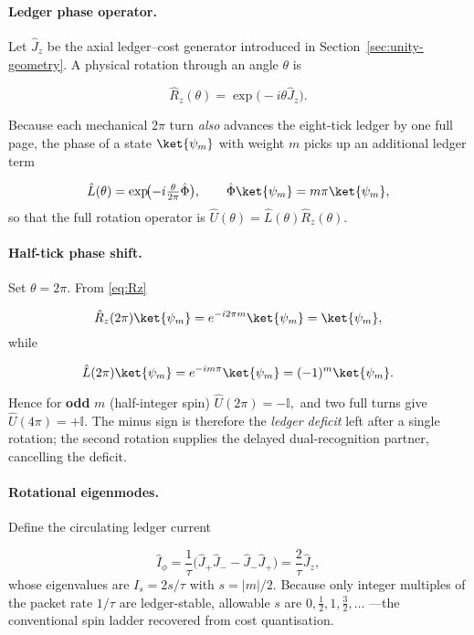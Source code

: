 \documentclass[11pt,oneside]{book}
\begin{document}
\paragraph{Ledger phase operator.}
Let $\hat J_{z}$ be the axial ledger–cost generator introduced in
Section~\ref{sec:unity-geometry}.  
A physical rotation through an angle $\theta$ is

\[
   \hat R_{z}(\theta)=\exp\!\bigl(-i\theta\hat J_{z}\bigr).
   \label{eq:Rz}
\]

Because each mechanical $2\pi$ turn \emph{also} advances the eight-tick
ledger by one full page, the phase of a state $\ket{\psi_{m}}$ with
weight $m$ picks up an additional ledger term

\[
   \hat L(\theta)
   =\exp\!\bigl(-i\tfrac{\theta}{2\pi}\hat{\Phi}\bigr),
   \qquad
   \hat{\Phi}\ket{\psi_{m}}=m\pi\ket{\psi_{m}} ,
\]
so that the full rotation operator is
\(
   \hat U(\theta)=\hat L(\theta)\hat R_{z}(\theta).
\)

\paragraph{Half-tick phase shift.}
Set $\theta=2\pi$.  From \eqref{eq:Rz}  

\[
   \hat R_{z}(2\pi)\ket{\psi_{m}} = e^{-i2\pi m}\ket{\psi_{m}}
                                   =\ket{\psi_{m}} ,
\]
while  

\[
   \hat L(2\pi)\ket{\psi_{m}}
   = e^{-i m\pi}\ket{\psi_{m}}
   = (-1)^{m}\ket{\psi_{m}}.
\]

\noindent
Hence for \textbf{odd} $m$ (half-integer spin)
\(
   \hat U(2\pi)=-\mathbb I,
\)
and two full turns give
\(
   \hat U(4\pi)=+\mathbb I.
\)
The minus sign is therefore the \emph{ledger deficit} left after a
single rotation; the second rotation supplies the delayed
dual-recognition partner, cancelling the deficit.

\paragraph{Rotational eigenmodes.}
Define the circulating ledger current

\[
   \hat I_{\phi}
   = \frac{1}{\tau}\bigl(\hat J_{+}\hat J_{-}-\hat J_{-}\hat J_{+}\bigr)
   = \frac{2}{\tau}\hat J_{z},
\]
whose eigenvalues are
\(
   I_{s}=2s/\tau
\)
with $s=|m|/2$.  
Because only integer multiples of the packet rate
\(1/\tau\) are ledger-stable, allowable $s$ are
\(
   0,\tfrac12,1,\tfrac32,\dots
\)
—the conventional spin ladder recovered from cost quantisation.
\end{document}
